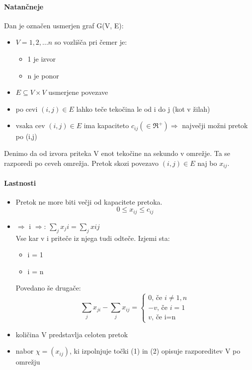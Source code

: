 \documentclass[a4paper,10pt]{article}
\begin{document}
\paragraph{Natan\v cneje}
Dan je ozna\v cen usmerjen graf G(V, E):
\begin{itemize}
\item $V={1,2,...n}$ so vozli\v s\v ca pri \v cemer je:
	\begin{itemize}
	\item 1 je izvor
	\item n je ponor	
	\end{itemize}
\item $E \subseteq V \times V$ usmerjene povezave
\item po cevi $(i,j) \in E$ lahko te\v ce teko\v cina le od i do j (kot v \v zilah)
\item vsaka cev $(i,j) \in E$ ima kapaciteto $c_{ij}(\in \Re ^+) \Longrightarrow $ najve\v cji mo\v zni pretok po (i,j)
\end{itemize}

Denimo da od izvora priteka V enot teko\v cine na sekundo v omre\v zje. Ta se razporedi po ceveh omre\v zja. Pretok skozi povezavo $(i,j) \in E$ naj bo $x_{ij}$.

\paragraph{Lastnosti}
\begin{itemize}
\item Pretok ne more biti ve\v cji od kapacitete pretoka.
\begin{equation}
0 \leq x_{ij} \leq c_{ij}
\label{pretok}
\end{equation}
\item $\Longrightarrow$ i $\Longrightarrow$: $\sum_j x_ji = \sum_j x{ij}$\\
	Vse kar v i prite\v ce iz njega tudi odte\v ce. Izjemi sta:
	\begin{itemize}
	\item i = 1
	\item i = n
	\end{itemize}
	Povedano \v se druga\v ce:
\begin{equation}
\sum_j x_{ji} - \sum_j x_{ij} = 
\left \{
\begin{array}{l}
0 \mbox{, \v ce } i \neq 1,n \\
-v \mbox{, \v ce } i=1 \\
v \mbox{, \v ce i=n}
\end{array}
\right.
\label{pritok=odtok}
\end{equation}
\item koli\v cina V predstavlja celoten pretok
\item nabor $\chi = (x_{ij})$, ki izpolnjuje to\v cki (1) in (2) opisuje razporeditev V po omre\v zju
\end{itemize}
\end{document}
